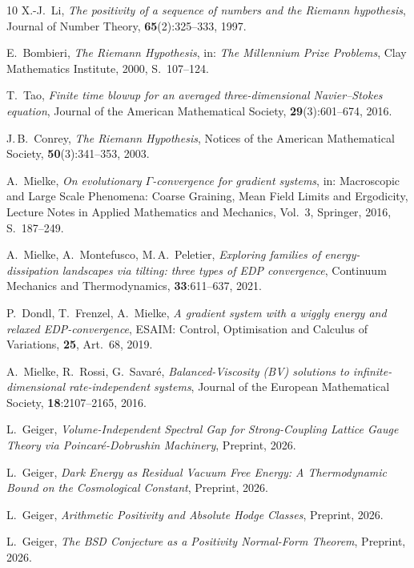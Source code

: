 \documentclass[12pt,a4paper]{article}
\theoremstyle{definition}
\theoremstyle{remark}
\begin{document}
\begin{thebibliography}{10}
X.-J.~Li,
\emph{The positivity of a sequence of numbers and the Riemann hypothesis},
Journal of Number Theory, \textbf{65}(2):325--333, 1997.

E.~Bombieri,
\emph{The Riemann Hypothesis},
in: \emph{The Millennium Prize Problems}, Clay Mathematics Institute, 2000, S.~107--124.

T.~Tao,
\emph{Finite time blowup for an averaged three-dimensional Navier--Stokes equation},
Journal of the American Mathematical Society, \textbf{29}(3):601--674, 2016.

J.\,B.~Conrey,
\emph{The Riemann Hypothesis},
Notices of the American Mathematical Society, \textbf{50}(3):341--353, 2003.

A.~Mielke,
\emph{On evolutionary $\Gamma$-convergence for gradient systems},
in: Macroscopic and Large Scale Phenomena: Coarse Graining, Mean Field Limits and Ergodicity,
Lecture Notes in Applied Mathematics and Mechanics, Vol.~3, Springer, 2016, S.~187--249.

A.~Mielke, A.~Montefusco, M.\,A.~Peletier,
\emph{Exploring families of energy-dissipation landscapes via tilting: three types of EDP convergence},
Continuum Mechanics and Thermodynamics, \textbf{33}:611--637, 2021.

P.~Dondl, T.~Frenzel, A.~Mielke,
\emph{A gradient system with a wiggly energy and relaxed EDP-convergence},
ESAIM: Control, Optimisation and Calculus of Variations, \textbf{25}, Art.~68, 2019.

A.~Mielke, R.~Rossi, G.~Savar\'e,
\emph{Balanced-Viscosity (BV) solutions to infinite-dimensional rate-independent systems},
Journal of the European Mathematical Society, \textbf{18}:2107--2165, 2016.

L.~Geiger, \textit{Volume-Independent Spectral Gap for Strong-Coupling Lattice Gauge Theory via Poincar\'e-Dobrushin Machinery}, Preprint, 2026.

L.~Geiger, \textit{Dark Energy as Residual Vacuum Free Energy: A Thermodynamic Bound on the Cosmological Constant}, Preprint, 2026.

L.~Geiger, \textit{Arithmetic Positivity and Absolute Hodge Classes}, Preprint, 2026.

L.~Geiger, \textit{The BSD Conjecture as a Positivity Normal-Form Theorem}, Preprint, 2026.


\end{thebibliography}
\end{document}
